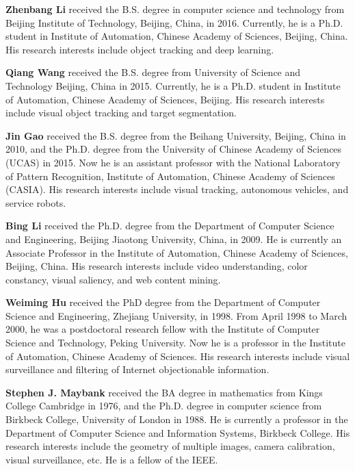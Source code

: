 \documentclass[preprint,10pt]{article}
\date{}
\begin{document}
\noindent \textbf{Zhenbang Li} received the B.S. degree in computer science and technology from Beijing Institute of Technology, Beijing, China, in 2016. Currently, he is a Ph.D. student in Institute of Automation, Chinese Academy of Sciences, Beijing, China. His research interests include object tracking and deep learning.
\vspace{6mm}

\noindent \textbf{Qiang Wang} received the B.S. degree from University of Science and Technology Beijing, China in 2015. Currently, he is a Ph.D. student in Institute of Automation, Chinese Academy of Sciences, Beijing. His research interests include visual object tracking and target segmentation.
\vspace{6mm}

\noindent \textbf{Jin Gao} received the B.S. degree from the Beihang University, Beijing, China in 2010, and the Ph.D. degree from the University of Chinese Academy of Sciences (UCAS) in 2015. Now he is an assistant professor with the National Laboratory of Pattern Recognition, Institute of Automation, Chinese Academy of Sciences (CASIA). His research interests include visual tracking, autonomous vehicles, and service robots. 
\vspace{6mm}

\noindent \textbf{Bing Li} received the Ph.D. degree from the Department of Computer Science and Engineering, Beijing Jiaotong University, China, in 2009. He is currently an Associate Professor in the Institute of Automation, Chinese Academy of Sciences, Beijing, China. His research interests include video understanding, color constancy, visual saliency, and web content mining.
\vspace{6mm}

\noindent \textbf{Weiming Hu} received the PhD degree from the
Department of Computer Science and Engineering, Zhejiang University, in 1998. From April 1998
to March 2000, he was a postdoctoral research
fellow with the Institute of Computer Science and
Technology, Peking University. Now he is a
professor in the Institute of Automation, Chinese
Academy of Sciences. His research interests
include visual surveillance and filtering of Internet
objectionable information.
\vspace{6mm}

\noindent \textbf{Stephen J. Maybank} received the BA degree in mathematics from Kings College Cambridge in 1976, and the Ph.D. degree in computer science from Birkbeck College, University of London in 1988. He is currently a professor in the Department of Computer Science and Information Systems, Birkbeck College. His research interests include the geometry of multiple images, camera calibration, visual surveillance, etc. He is a fellow of the IEEE.
\vspace{6mm}
\end{document}
